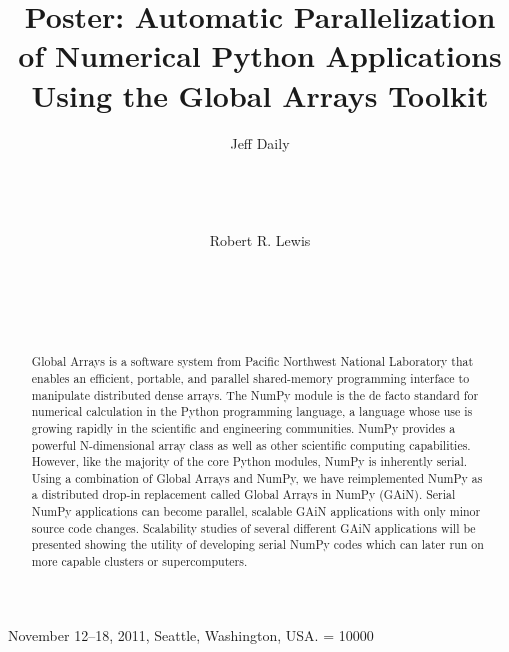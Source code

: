\documentclass{sig-alt-release2}
\begin{document}
 {November 12--18, 2011, Seattle, Washington, USA.} 
\widowpenalty = 10000

\title{Poster: Automatic Parallelization of Numerical Python Applications Using the Global Arrays Toolkit}

\textwidth
{}
\author{
\alignauthor
Jeff Daily\\
\\
\\
\\
\\
\alignauthor
Robert R. Lewis\\
\\
\\
\\
\\
}

\maketitle
\begin{abstract}
Global Arrays is a software system from Pacific Northwest National Laboratory
that enables an efficient, portable, and parallel shared-memory programming
interface to manipulate distributed dense arrays. The NumPy module is the de
facto standard for numerical calculation in the Python programming language, a
language whose use is growing rapidly in the scientific and engineering
communities. NumPy provides a powerful N-dimensional array class as well as
other scientific computing capabilities. However, like the majority of the core
Python modules, NumPy is inherently serial. Using a combination of Global
Arrays and NumPy, we have reimplemented NumPy as a distributed drop-in
replacement called Global Arrays in NumPy (GAiN). Serial NumPy applications can
become parallel, scalable GAiN applications with only minor source code
changes.  Scalability studies of several different GAiN applications will be
presented showing the utility of developing serial NumPy codes which can later
run on more capable clusters or supercomputers.
\end{abstract}
\end{document}
